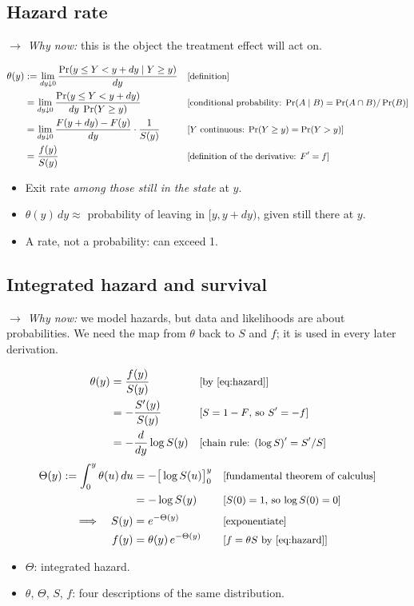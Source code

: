 \documentclass[11pt]{article}
\newcommand{\1}{\mathbf{1}}
\newcommand{\why}[1]{\text{\small[#1]}}
\newcommand{\whynow}[1]{\par\noindent\textit{$\rightarrow$ Why now:} #1\par}
\begin{document}
\subsection{Hazard rate}
\whynow{this is the object the treatment effect will act on.}
\begin{align}
  \theta(y) &:= \lim_{dy\downarrow 0} \frac{\Pr(y \le Y < y+dy \mid Y \ge y)}{dy} && \why{definition} \nonumber\\
  &= \lim_{dy\downarrow 0} \frac{\Pr(y \le Y < y+dy)}{dy\;\Pr(Y\ge y)} && \why{conditional probability: $\Pr(A\mid B)=\Pr(A\cap B)/\Pr(B)$} \nonumber\\
  &= \lim_{dy\downarrow 0} \frac{F(y+dy)-F(y)}{dy}\cdot\frac{1}{S(y)} && \why{$Y$ continuous: $\Pr(Y\ge y)=\Pr(Y>y)$} \nonumber\\
  &= \frac{f(y)}{S(y)} && \why{definition of the derivative: $F'=f$} \label{eq:hazard}
\end{align}
\begin{itemize}
  \item Exit rate \emph{among those still in the state} at $y$.
  \item $\theta(y)\,dy \approx$ probability of leaving in $[y,y+dy)$, given still there at $y$.
  \item A rate, not a probability: can exceed 1.
\end{itemize}

\subsection{Integrated hazard and survival}
\whynow{we model hazards, but data and likelihoods are about probabilities. We need the map from $\theta$ back to $S$ and $f$; it is used in every later derivation.}
\begin{align}
  \theta(y) &= \frac{f(y)}{S(y)} && \why{by \eqref{eq:hazard}} \nonumber\\
  &= -\frac{S'(y)}{S(y)} && \why{$S=1-F$, so $S'=-f$} \nonumber\\
  &= -\frac{d}{dy}\log S(y) && \why{chain rule: $(\log S)'=S'/S$} \nonumber
\end{align}
\begin{align}
  \Theta(y) := \int_0^y \theta(u)\,du
  &= -\big[\log S(u)\big]_0^y && \why{fundamental theorem of calculus} \nonumber\\
  &= -\log S(y) && \why{$S(0)=1$, so $\log S(0)=0$} \nonumber\\[2pt]
  \Longrightarrow\quad S(y) &= e^{-\Theta(y)} && \why{exponentiate} \label{eq:survival}\\
  f(y) &= \theta(y)\,e^{-\Theta(y)} && \why{$f=\theta S$ by \eqref{eq:hazard}} \label{eq:density}
\end{align}
\begin{itemize}
  \item $\Theta$: integrated hazard.
  \item $\theta$, $\Theta$, $S$, $f$: four descriptions of the same distribution.
\end{itemize}
\end{document}
